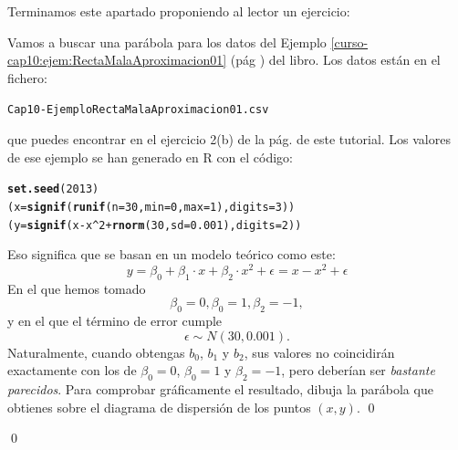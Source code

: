 \documentclass[10pt,a4paper]{article}\usepackage[]{graphicx}\usepackage[]{color}
\makeatletter
\newcommand{\hlnum}[1]{\textcolor[rgb]{0.686,0.059,0.569}{#1}}%
\newcommand{\hlopt}[1]{\textcolor[rgb]{0,0,0}{#1}}%
\newcommand{\hlstd}[1]{\textcolor[rgb]{0.345,0.345,0.345}{#1}}%
\newcommand{\hlkwb}[1]{\textcolor[rgb]{0.69,0.353,0.396}{#1}}%
\newcommand{\hlkwc}[1]{\textcolor[rgb]{0.333,0.667,0.333}{#1}}%
\newcommand{\hlkwd}[1]{\textcolor[rgb]{0.737,0.353,0.396}{\textbf{#1}}}%
\newenvironment{kframe}{%
 \def\at@end@of@kframe{}%
 \ifinner\ifhmode%
  \def\at@end@of@kframe{\end{minipage}}%
  \begin{minipage}{\columnwidth}%
 \fi\fi%
 \def\FrameCommand##1{\hskip\@totalleftmargin \hskip-\fboxsep
 \colorbox{shadecolor}{##1}\hskip-\fboxsep
     \hskip-\linewidth \hskip-\@totalleftmargin \hskip\columnwidth}%
 \MakeFramed {\advance\hsize-\width
   \@totalleftmargin\z@ \linewidth\hsize
   \@setminipage}}%
 {\par\unskip\endMakeFramed%
 \at@end@of@kframe}
\newenvironment{knitrout}{}{} %
\newcounter {cont01}
\makeatother
\begin{document}
Terminamos este apartado proponiendo al lector un ejercicio:
\begin{ejercicio}
\label{tut10:ejercicio10}
Vamos a buscar una parábola para los datos del Ejemplo \ref{curso-cap10:ejem:RectaMalaAproximacion01} (pág \pageref{curso-cap10:ejem:RectaMalaAproximacion01}) del libro. Los datos están en el fichero:
\begin{center}
{\tt Cap10-EjemploRectaMalaAproximacion01.csv}
\end{center}
que puedes encontrar en el ejercicio 2(b) de la pág. \pageref{tut10:ejercicio03} de este tutorial. Los valores de ese ejemplo se han generado en R con el código:
\begin{knitrout}
\color{fgcolor}\begin{kframe}
\begin{alltt}
\hlkwd{set.seed}\hlstd{(}\hlnum{2013}\hlstd{)}
\hlstd{(x} \hlkwb{=} \hlkwd{signif}\hlstd{(}\hlkwd{runif}\hlstd{(}\hlkwc{n}\hlstd{=}\hlnum{30}\hlstd{,} \hlkwc{min}\hlstd{=}\hlnum{0}\hlstd{,} \hlkwc{max}\hlstd{=}\hlnum{1} \hlstd{),} \hlkwc{digits}\hlstd{=}\hlnum{3}\hlstd{) )}
\hlstd{(y} \hlkwb{=} \hlkwd{signif}\hlstd{(x}\hlopt{-}\hlstd{x}\hlopt{^}\hlnum{2}\hlopt{+}\hlkwd{rnorm}\hlstd{(}\hlnum{30}\hlstd{,}\hlkwc{sd}\hlstd{=}\hlnum{0.001}\hlstd{),}\hlkwc{digits}\hlstd{=}\hlnum{2} \hlstd{) )}
\end{alltt}
\end{kframe}
\end{knitrout}
Eso significa que se basan en un modelo teórico como este:
\[y=\beta_0+\beta_1\cdot x+\beta_2\cdot x^2+\epsilon=x-x^2+\epsilon\]
En el que hemos tomado
\[\beta_0=0, \beta_0=1, \beta_2=-1,\]
y en el que el término de error cumple
\[\epsilon\sim N(30,0.001).\]
Naturalmente, cuando obtengas $b_0$, $b_1$ y $b_2$, sus valores no coincidirán exactamente con los de $\beta_0=0$, $\beta_0=1$ y $\beta_2=-1$, pero deberían ser {\em bastante parecidos}. Para comprobar gráficamente el resultado, dibuja la parábola que obtienes sobre el diagrama de dispersión de los puntos $(x,y)$.
\qed
\end{ejercicio}




\qed
\end{document}
